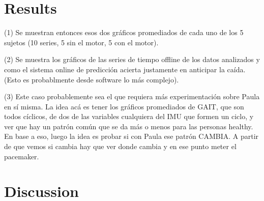 \documentclass[conference]{IEEEtran}
\begin{document}
%
%

\section*{Results}

(1) Se muestran entonces esos dos gráficos promediados de cada uno de los 5 sujetos (10 series, 5 sin el motor, 5 con el motor).


(2) Se muestra los gráficos de las series de tiempo offline de los datos analizados y como el sistema online de predicción acierta justamente en anticipar la caída.  (Esto es probablmente desde software lo más complejo).

(3) Este caso probablemente sea el que requiera más experimentación sobre Paula en sí misma.  La idea acá es tener los gráficos promediados de GAIT, que son todos cíclicos, de dos de las variables cualquiera del IMU que formen un ciclo, y ver que hay un patrón común que se da más o menos para las personas healthy.  En base a eso, luego la idea es probar si con Paula ese patrón CAMBIA.  A partir de que vemos si cambia hay que ver donde cambia y en ese punto meter el pacemaker.

\section*{Discussion}
\end{document}
